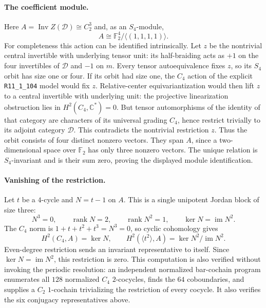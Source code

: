 \paragraph{The coefficient module.}
Here $A=\operatorname{Inv}Z(\mathcal D)\cong C_2^3$ and, as an $S_4$-module,
\[
 A\cong\mathbb F_2^4/\langle(1,1,1,1)\rangle.
\]
For completeness this action can be identified intrinsically. Let $z$
be the nontrivial central invertible with underlying tensor unit: its
half-braiding acts as $+1$ on the four invertibles of $\mathcal D$ and
$-1$ on $m$. Every tensor autoequivalence fixes $z$, so its $S_4$ orbit
has size one or four. If its orbit had size one, the $C_4$ action of
the explicit \texttt{R11\_1\_104} model would fix $z$.
Relative-center equivariantization \cite{CentersGraded} would then lift
$z$ to a central invertible with underlying unit: the projective
linearization obstruction lies in $H^2(C_4,\mathbb C^*)=0$.
But tensor automorphisms of the identity of that category are
characters of its universal grading $C_4$, hence restrict trivially
to its adjoint category $\mathcal D$. This contradicts the nontrivial
restriction $z$.
Thus the orbit consists of four distinct nonzero vectors. They span
$A$, since a two-dimensional space over $\mathbb F_2$ has only three
nonzero vectors. The unique relation is $S_4$-invariant and is their
sum zero, proving the displayed module identification.

\paragraph{Vanishing of the restriction.}
Let $t$ be a $4$-cycle and $N=t-1$ on $A$. This is a single unipotent
Jordan block of size three:
\[
 N^3=0,\qquad \operatorname{rank}N=2,\qquad
 \operatorname{rank}N^2=1,\qquad \ker N=\operatorname{im}N^2.
\]
The $C_4$ norm is $1+t+t^2+t^3=N^3=0$, so cyclic cohomology gives
\[
 H^2(C_4,A)=\ker N,\qquad
 H^2(\langle t^2\rangle,A)=\ker N^2/\operatorname{im}N^2.
\]
Even-degree restriction sends an invariant representative to itself.
Since $\ker N=\operatorname{im}N^2$, this restriction is zero.
This computation is also verified without invoking the periodic
resolution: an independent normalized bar-cochain program enumerates
all $128$ normalized $C_4$ $2$-cocycles, finds the $64$ coboundaries,
and supplies a $C_2$ $1$-cochain trivializing the restriction of every
cocycle. It also verifies the six conjugacy representatives above.


